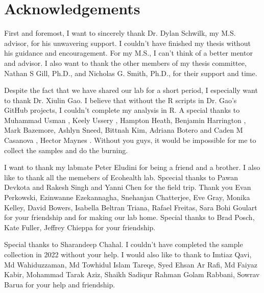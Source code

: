 \documentclass{ttuthes2007}
\begin{document}

\frontmatter

\chapter{\textbf{Acknowledgements}}
\noindent First and foremost, I want to sincerely thank Dr. Dylan Schwilk, my M.S. advisor, for his unwavering support. I couldn't have finished my thesis without his guidance and encouragement. For my M.S., I can't think of a better mentor and advisor. I also want to thank the other members of my thesis committee, Nathan S Gill, Ph.D., and Nicholas G. Smith, Ph.D., for their support and time.

Despite the fact that we have shared our lab for a short period, I especially want to thank Dr. Xiulin Gao. I believe that without the R scripts in Dr. Gao's GitHub projects, I couldn't complete my analysis in R. A special thanks to Muhammad Usman , Keely Ussery , Hampton Heath, Benjamin Harrington , Mark Bazemore, Ashlyn Sneed, Bittnah Kim,  Adriana Botero and  Caden M Casanova , Hector Maynes
. Without you guys, it would be impossible for me to collect the samples and do the burning.

I want to thank my labmate Peter Eludini for being a friend and a brother. I also like to thank all the memebers of Ecohealth lab. Spcecial thanks to Pawan Devkota and  Rakesh Singh and Yanni Chen for the field trip. Thank you Evan Perkowski, Ezinwanne Ezekannagha,  Snehanjan Chatterjee, Eve Gray, Monika Kelley, David Bowers, Isabella Beltran Triana, Rafael Freitas, Sara Bohi Goulart for your friendship and for making our lab home. Special thanks to Brad Posch, Kate Fuller,  Jeffrey Chieppa for your friendship. 

Special thanks to  Sharandeep Chahal. I couldn't have completed the sample collection in 2022 without your help. I would also like to thank to Imtiaz Qavi,  Md Wahiduzzaman,
Md Towhidul Islam Tareqe, Syed Ehsan Ar Rafi, Md Faiyaz Kabir, Mohammad Tarak Aziz, Shaikh Sadiqur Rahman Golam Rabbani, Sowrav Barua for your help and friendship.
\end{document}
